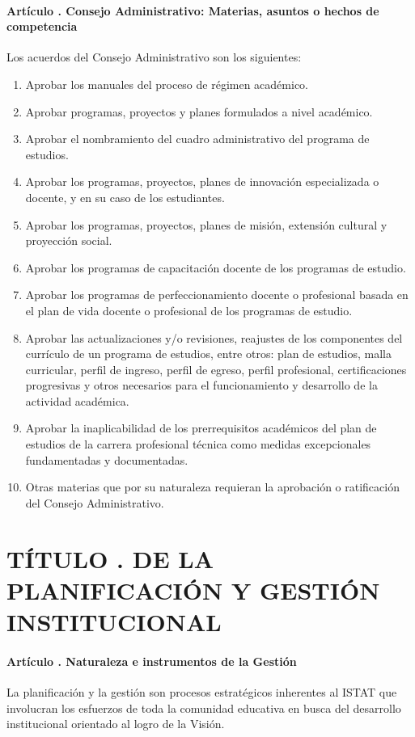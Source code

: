\subsection{Artículo . Consejo Administrativo: Materias, asuntos o hechos de competencia}
\addtocounter{ns}{1}
Los acuerdos del Consejo Administrativo son los siguientes: 
\begin{enumerate}
\item Aprobar los manuales del proceso de régimen académico.
\item Aprobar programas, proyectos y planes formulados a nivel académico. 
\item Aprobar el nombramiento del cuadro administrativo del programa de estudios. 
\item Aprobar los programas, proyectos, planes de innovación especializada o docente, y en su caso de los estudiantes. 
\item Aprobar los programas, proyectos, planes de misión, extensión cultural y proyección social. 
\item Aprobar los programas de capacitación docente de los programas de estudio. 
\item Aprobar los programas de perfeccionamiento docente o profesional basada en el plan de vida docente o profesional de los programas de estudio. 
\item Aprobar las actualizaciones y/o revisiones, reajustes de los componentes del currículo de un programa de estudios, entre otros: plan de estudios, malla curricular, perfil de ingreso, perfil de egreso, perfil profesional, certificaciones progresivas y otros necesarios para el funcionamiento y desarrollo de la actividad académica. 
\item Aprobar la inaplicabilidad de los prerrequisitos académicos del plan de estudios de la carrera profesional técnica como medidas excepcionales fundamentadas y documentadas. 
\item Otras materias que por su naturaleza requieran la aprobación o ratificación del Consejo Administrativo. 
\end{enumerate}
\part{TÍTULO . DE LA PLANIFICACIÓN Y GESTIÓN INSTITUCIONAL}
\addtocounter{ns}{1}
\subsection{Artículo . Naturaleza e instrumentos de la Gestión}
\addtocounter{ns}{1}
La planificación y la gestión son procesos estratégicos inherentes al ISTAT que involucran los esfuerzos de toda la comunidad educativa en busca del desarrollo institucional orientado al logro de la Visión. 

